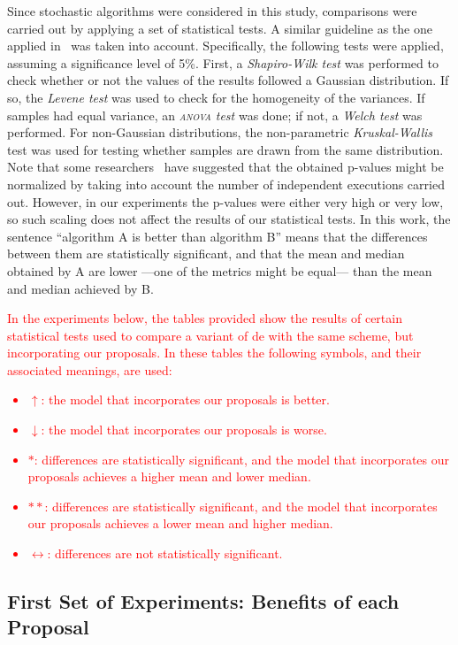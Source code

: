 \documentclass[review,3p]{elsarticle}
\newcommand{\DE}{{\sc de}}
\begin{document}
Since stochastic algorithms were considered in this study, comparisons were carried out by applying a set of statistical tests.
%
A similar guideline as the one applied in~\cite{Durillo:10} was taken into account.
%
Specifically, the following tests were applied, assuming a significance level of 5\%.
%
First, a \emph{Shapiro-Wilk test} was performed to check whether or not
the values of the results followed a Gaussian distribution.
%
If so, the \emph{Levene test} was used to check for the homogeneity of the variances.
%
If samples had equal variance, an \emph{\textsc{anova} test} was done; if not, a \emph{Welch test} was performed.
%
For non-Gaussian distributions, the non-parametric \emph{Kruskal-Wallis} test was
used for testing whether samples are drawn from the same distribution.
%
Note that some researchers~\cite{Good:92} have suggested that the obtained p-values might be normalized 
by taking into account the number of independent executions carried out.
%
However, in our experiments the p-values were either very high or very low, so such scaling does not
affect the results of our statistical tests.
%
In this work, the sentence ``algorithm A is better than algorithm B'' means that the
differences between them are statistically significant, and that the mean and median obtained
by A are lower ---one of the metrics might be equal--- than the mean and median achieved by B.
%
\textcolor{red}{
In the experiments below, the tables provided show the results of certain statistical tests used to
compare a variant of \DE{} with the same scheme, but incorporating our proposals.
%
In these tables the following symbols, and their associated meanings, are used:
%
\begin{itemize}
	\item $\uparrow$: the model that incorporates our proposals is better.
	\item $\downarrow$: the model that incorporates our proposals is worse.
	\item $*$: differences are statistically significant, and the model that incorporates our proposals achieves a higher mean and lower median.
	\item $**$: differences are statistically significant, and the model that incorporates our proposals  achieves a lower mean and higher median.
	\item $\leftrightarrow$: differences are not statistically significant.
\end{itemize}
%
}

\subsection{First Set of Experiments: Benefits of each Proposal}
\end{document}
